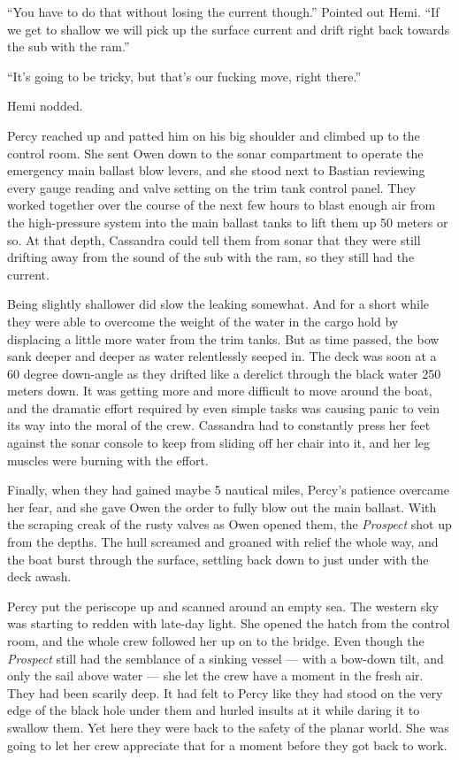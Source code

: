 \documentclass[]{scrbook}
\begin{document}
``You have to do that without losing the current though.'' Pointed out
Hemi. ``If we get to shallow we will pick up the surface current and
drift right back towards the sub with the ram.''

``It's going to be tricky, but that's our fucking move, right there.''

Hemi nodded.

Percy reached up and patted him on his big shoulder and climbed up to
the control room. She sent Owen down to the sonar compartment to operate
the emergency main ballast blow levers, and she stood next to Bastian
reviewing every gauge reading and valve setting on the trim tank control
panel. They worked together over the course of the next few hours to
blast enough air from the high-pressure system into the main ballast
tanks to lift them up 50 meters or so. At that depth, Cassandra could
tell them from sonar that they were still drifting away from the sound
of the sub with the ram, so they still had the current.

Being slightly shallower did slow the leaking somewhat. And for a short
while they were able to overcome the weight of the water in the cargo
hold by displacing a little more water from the trim tanks. But as time
passed, the bow sank deeper and deeper as water relentlessly seeped in.
The deck was soon at a 60 degree down-angle as they drifted like a
derelict through the black water 250 meters down. It was getting more
and more difficult to move around the boat, and the dramatic effort
required by even simple tasks was causing panic to vein its way into the
moral of the crew. Cassandra had to constantly press her feet against
the sonar console to keep from sliding off her chair into it, and her
leg muscles were burning with the effort.

Finally, when they had gained maybe 5 nautical miles, Percy's patience
overcame her fear, and she gave Owen the order to fully blow out the
main ballast. With the scraping creak of the rusty valves as Owen opened
them, the \emph{Prospect} shot up from the depths. The hull screamed and
groaned with relief the whole way, and the boat burst through the
surface, settling back down to just under with the deck awash.

Percy put the periscope up and scanned around an empty sea. The western
sky was starting to redden with late-day light. She opened the hatch
from the control room, and the whole crew followed her up on to the
bridge. Even though the \emph{Prospect} still had the semblance of a
sinking vessel --- with a bow-down tilt, and only the sail above water
--- she let the crew have a moment in the fresh air. They had been
scarily deep. It had felt to Percy like they had stood on the very edge
of the black hole under them and hurled insults at it while daring it to
swallow them. Yet here they were back to the safety of the planar world.
She was going to let her crew appreciate that for a moment before they
got back to work.
\end{document}
